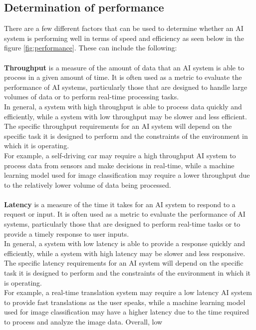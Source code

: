 \subsection{Determination of performance}
There are a few different factors that can be used to determine
whether an AI system is performing well in terms of speed and efficiency as seen below in the figure \ref{fig:performance}.
These can include the following:
\\
\\
\textbf{Throughput} is a measure of the amount of data that an AI system is able to process in a given amount of time.
It is often used as a metric to evaluate the performance of AI systems, particularly those that are designed
to handle large volumes of data or to perform real-time processing tasks.
\\
In general, a system with high throughput is able to process data quickly and efficiently,
while a system with low throughput may be slower and less efficient. The specific throughput
requirements for an AI system will depend on the specific task it is designed to perform and the
constraints of the environment in which it is operating.
\\
For example, a self-driving car may require a high throughput AI system to process data from sensors
and make decisions in real-time, while a machine learning model used for image classification may require a 
lower throughput due to the relatively lower volume of data being processed.
\\
\\
\textbf{Latency} is a measure of the time it takes for an AI system to respond to a request or input.
It is often used as a metric to evaluate the performance of AI systems, particularly those that 
are designed to perform real-time tasks or to provide a timely response to user inputs.
\\
In general, a system with low latency is able to provide a response quickly and efficiently, 
while a system with high latency may be slower and less responsive. The specific latency requirements 
for an AI system will depend on the specific task it is designed to perform and the constraints of the 
environment in which it is operating.
\\
For example, a real-time translation system may require a low latency AI system to provide fast 
translations as the user speaks, while a machine learning model used for image classification may 
have a higher latency due to the time required to process and analyze the image data. Overall, low 
